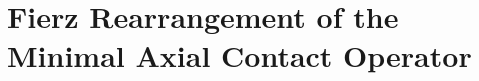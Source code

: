 \documentclass[aps,prd,twocolumn,superscriptaddress,preprintnumbers,nofootinbib,longbibliography,floatfix]{revtex4-2}
\newcommand{\MPl}{M_{\rm Pl}}
\begin{document}

\section{Fierz Rearrangement of the Minimal Axial Contact Operator}
\label{app:fierz}
\end{document}
